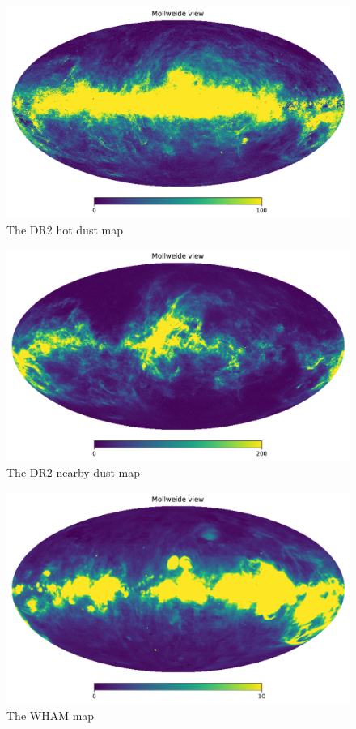 \documentclass{aa}
\begin{document}
\begin{figure}
  \centering
  \includegraphics[width=\columnwidth]{figures/hot_dust.pdf}
  \caption{The DR2 hot dust map}
  \label{fig:hot_dust}
\end{figure}
\begin{figure}
  \centering
  \includegraphics[width=\columnwidth]{figures/nearby_dust.pdf}
  \caption{The DR2 nearby dust map}
  \label{fig:nearby_dust}
\end{figure}
\begin{figure}
  \centering
  \includegraphics[width=\columnwidth]{figures/wham.pdf}
  \caption{The WHAM map}
  \label{fig:wham}
\end{figure}
\end{document}
